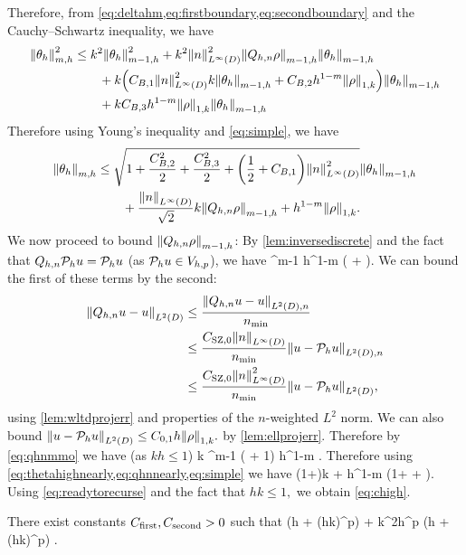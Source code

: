 Therefore, from \cref{eq:deltahm,eq:firstboundary,eq:secondboundary} and the Cauchy--Schwartz inequality, we have
\begin{align*}
\Nfn{m,h}{\thetah}^2 &\leq k^2 \Nfn{m-1,h}{\thetah}^2 + k^2 \NLiD{n}^2 \Nfn{m-1,h}{\Qhn \rho}\Nfn{m-1,h}{\thetah}\nonumber\\
&\quad\quad+ k\mleft(\CBo \NLiD{n}^2 k\Nfn{m-1,h}{\thetah}+ \CBt h^{1-m} \NW{\rho}\mright)\Nfn{m-1,h}{\thetah}\nonumber\\
&\quad\quad+ k \CBth h^{1-m} \NW{\rho} \Nfn{m-1,h}{\thetah}%
\end{align*}
Therefore using Young's inequality and \cref{eq:simple}, we have
\begin{align}
\Nfn{m,h}{\thetah} &\leq\sqrt{1+\frac{\CBt^2}2 + \frac{\CBth^2}2 + \mleft(\half+\CBo\mright)\NLiD{n}^2}\Nfn{m-1,h}{\thetah}\\
&\quad\quad+ \frac{\NLiD{n}}{\sqrt{2}} k \Nfn{m-1,h}{\Qhn \rho} +  h^{1-m} \NW{\rho}.\label{eq:thetahighnearly}
\end{align}
We now proceed to bound $\Nfn{m-1,h}{\Qhn \rho}$: By \cref{lem:inversediscrete} and the fact that $Q_{h,n} \mathcal P_{h} u = \mathcal P_{h} u$ (as $\mathcal P_{h} u \in V_{h,p}$), we have
\beq\label{eq:qhnmmo}
 \leq \Chinv^{m-1} h^{1-m} \mleft( + \mright).
\eeq
We can bound the first of these terms by the second:
\begin{align*}
\NLtD{\Qhn u - u} &\leq \frac{\NLtDn{\Qhn u - u}}{\nmin}\\
&\leq \frac{\CSZfn{0} \NLiD{n}}{\nmin} \NLtDn{u - \Ph u}\\
&\leq \frac{\CSZfn{0}\NLiD{n}^2}{\nmin} \NLtD{u-\Ph u},
\end{align*}
using \cref{lem:wltdprojerr} and properties of the $n$-weighted $L^2$ norm. We can also bound $\NLtD{u - \Ph u} \leq \Cfn{0,1} h \NW{\rho}.$ by \cref{lem:ellprojerr}. Therefore by \cref{eq:qhnmmo} we have (as $kh \leq 1$)
\beq\label{eq:qhnnearly}
k  \leq \Chinv^{m-1} \mleft( + 1\mright)  h^{1-m} \NW{\rho}.
\eeq
Therefore using \cref{eq:thetahighnearly,eq:qhnnearly,eq:simple} we have
\beq\label{eq:readytorecurse}
 \leq \CReco \mleft(1+\mright)k  + \CRect h^{1-m} \mleft(1+ + \mright)\NW{\rho}.
\eeq
Using \cref{eq:readytorecurse} and the fact that $hk \leq 1,$ we obtain \cref{eq:chigh}.
\epf

\label{lem:ltthetahbound}
There exist constants $C_{\mathrm{first}}, C_{\mathrm{second}} > 0$ such that
\beq\label{eq:ltthetahbound}
\NLtD{\thetah} \leq \Cfirst \mleft(\CFEMotilde h + \CFEMttilde \CAnk (hk)^p\mright) \NW{\rho} + \Csecond k^2h^p \mleft(\CFEMotilde h + \CFEMttilde \CAnk (hk)^p\mright) .
\eeq
\ele

